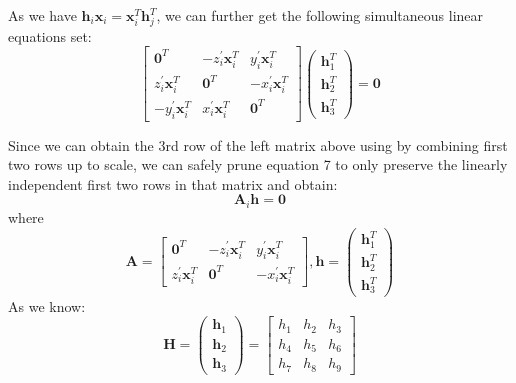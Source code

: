 \documentclass[conference]{IEEEtran}
\newcommand{\mat}[1]{\mathbf{#1}} %
\begin{document}
As we have $\mat{h}_i\mat{x}_i = \mat{x}_i^T \mat{h}_j^T$, we can further get the following simultaneous linear equations set:
\begin{equation}
	\begin{bmatrix}
		\mat{0}^T & -z_i^\prime\mat{x}_i^T & y_i^\prime\mat{x}_i^T\\
		z_i^\prime\mat{x}_i^T & \mat{0}^T & -x_i^\prime\mat{x}_i^T\\
		-y_i^\prime\mat{x}_i^T & x_i^\prime\mat{x}_i^T & \mat{0}^T
	\end{bmatrix}
	\begin{pmatrix}
		\mat{h}_1^T\\
		\mat{h}_2^T\\
		\mat{h}_3^T
	\end{pmatrix} = \mat{0}
\end{equation}

Since we can obtain the 3rd row of the left matrix above using by combining first two rows up to scale, we can safely prune equation 7 to only preserve the linearly independent first two rows in that matrix and obtain:
\begin{equation}
	\mat{A}_i
	\mat{h} = \mat{0}
\end{equation}
where
\begin{equation}
	\mat{A} = 
	\begin{bmatrix}
		\mat{0}^T & -z_i^\prime\mat{x}_i^T & y_i^\prime\mat{x}_i^T\\
		z_i^\prime\mat{x}_i^T & \mat{0}^T & -x_i^\prime\mat{x}_i^T
	\end{bmatrix}, 
	\mat{h} = 
	\begin{pmatrix}
		\mat{h}_1^T\\
		\mat{h}_2^T\\
		\mat{h}_3^T
	\end{pmatrix}
\end{equation}
As we know:
\begin{equation}
	\mat{H} = 
	\begin{pmatrix}
		\mat{h}_1\\
		\mat{h}_2\\
		\mat{h}_3
	\end{pmatrix}
	=
	\begin{bmatrix}
		h_1 & h_2 & h_3\\
		h_4 & h_5 & h_6\\
		h_7 & h_8 & h_9
	\end{bmatrix}
\end{equation}
\end{document}
